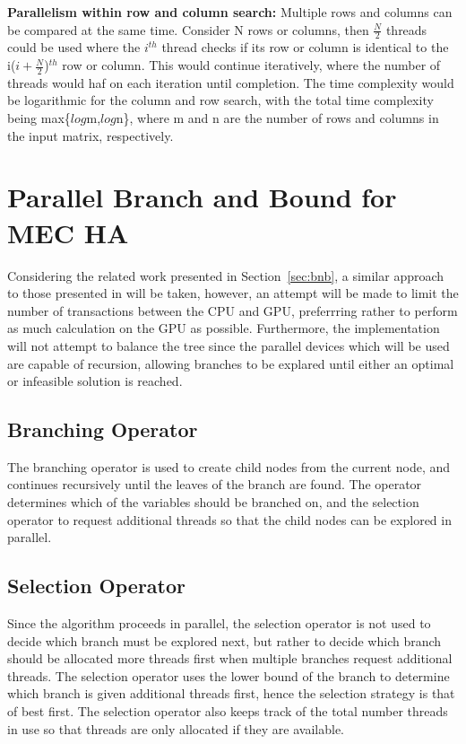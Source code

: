 \documentclass[10pt,a4paer,twocolumn]{article}
\begin{document}
\textbf{Parallelism within row and column search:}
Multiple rows and columns can be compared at the same time. Consider N rows or columns, then $\frac{N}{2}$
threads could be used where the $i^{th}$ thread checks if its row or column is identical to the i($i +
\frac{N}{2}$)$^{th}$ row or column. This would continue iteratively, where the number of threads would haf on
each iteration until completion. The time complexity would be logarithmic for the column and row search, with
the total time complexity being max\{$log$m,$log$n\}, where m and n are the number of rows and columns in the
input matrix, respectively.

\section{ Parallel Branch and Bound for MEC HA } \label{sec:parbnb}

Considering the related work presented in Section~\ref{sec:bnb}, a similar approach to those presented in
\cite{melab:2012, chakroun:2012, chakroun:2013} will be taken, however, an attempt will be made to limit the
number of transactions between the CPU and GPU, preferrring rather to perform as much calculation on the GPU
as possible. Furthermore, the implementation will not attempt to balance the tree since the parallel devices
which will be used are capable of recursion, allowing branches to be explared until either an optimal or
infeasible solution is reached.

\subsection{Branching Operator}

The branching operator is used to create child nodes from the current node, and continues recursively until
the leaves of the branch are found. The operator determines which of the variables should be branched 
on, and the selection operator to request additional threads so that the child nodes can be explored in
parallel.

\subsection{Selection Operator}

Since the algorithm proceeds in parallel, the selection operator is not used to decide which branch must be
explored next, but rather to decide which branch should be allocated more threads first when multiple branches
request additional threads. The selection operator uses the lower bound of the branch to determine which
branch is given additional threads first, hence the selection strategy is that of best first. The selection
operator also keeps track of the total number threads in use so that threads are only allocated if they are
available.
\end{document}
